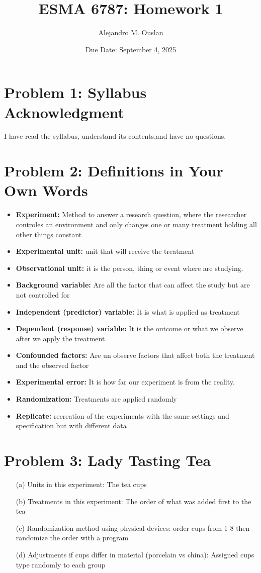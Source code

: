 \documentclass[10pt, oneside]{article}
\title{ESMA 6787: Homework 1}
\author{Alejandro M. Ouslan}
\date{Due Date: September 4, 2025}
\begin{document}
\maketitle

\vspace{.25in}

\section*{Problem 1: Syllabus Acknowledgment}
I have read the syllabus, understand its contents,and have no questions.


\section*{Problem 2: Definitions in Your Own Words}
\begin{itemize}
	\item \textbf{Experiment:} Method to answer a research question, where the researcher controles an
	      environment and only changes one or many treatment holding all other things constant
	\item \textbf{Experimental unit:} unit that will receive the treatment
	\item \textbf{Observational unit:}  it is the person, thing or event where are studying.
	\item \textbf{Background variable:} Are all the factor that can affect the study but are not controlled for
	\item \textbf{Independent (predictor) variable:} It is what is applied as treatment
	\item \textbf{Dependent (response) variable:} It is the outcome or what we observe after we apply the treatment
	\item \textbf{Confounded factors:} Are un observe factors that affect both the treatment and the observed factor
	\item \textbf{Experimental error:} It is how far our experiment is from the reality.
	\item \textbf{Randomization:} Treatments are applied randomly
	\item \textbf{Replicate:} recreation of the experiments with the same settings and specification but with different data
\end{itemize}

\section*{Problem 3: Lady Tasting Tea}
\begin{itemize}
	\item[(a)] Units in this experiment: The tea cups
	\item[(b)] Treatments in this experiment: The order of what was added first to the tea
	\item[(c)] Randomization method using physical devices: order cups from 1-8 then randomize the order with a program
	\item[(d)] Adjustments if cups differ in material (porcelain vs china): Assigned cups type randomly to each group
\end{itemize}
\end{document}
